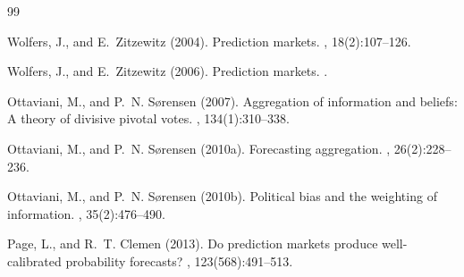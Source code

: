 \documentclass[a4paper,11pt]{article}
\theoremstyle{plain}
\theoremstyle{definition}
\theoremstyle{remark}
\begin{document}
\newpage
\begin{thebibliography}{99}

Wolfers, J., and E.~Zitzewitz (2004).
\newblock Prediction markets.
, 18(2):107--126.

Wolfers, J., and E.~Zitzewitz (2006).
\newblock Prediction markets.
.

Ottaviani, M., and P.~N. Sørensen (2007).
\newblock Aggregation of information and beliefs: A theory of divisive pivotal votes.
, 134(1):310--338.

Ottaviani, M., and P.~N. Sørensen (2010a).
\newblock Forecasting aggregation.
, 26(2):228--236.

Ottaviani, M., and P.~N. Sørensen (2010b).
\newblock Political bias and the weighting of information.
, 35(2):476--490.

Page, L., and R.~T. Clemen (2013).
\newblock Do prediction markets produce well-calibrated probability forecasts?
, 123(568):491--513.

\end{thebibliography}
\end{document}
